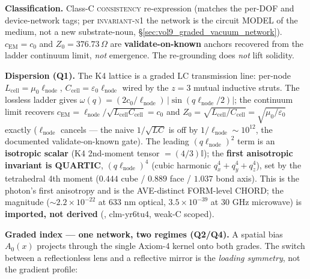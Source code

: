 \noindent\textbf{Classification.} Class-C \textsc{consistency} re-expression (matches the per-DOF and device-network tags; per \textsc{invariant-n1} the network is the circuit MODEL of the medium, not a new substrate-noun, \S\ref{sec:vol9_graded_vacuum_network}). $c_{\mathrm{EM}}=c_0$ and $Z_0=376.73\,\Omega$ are \textbf{validate-on-known} anchors recovered from the ladder continuum limit, \emph{not} emergence. The re-grounding does \emph{not} lift solidity.

\medskip\noindent\textbf{Dispersion (Q1).} The K4 lattice is a graded LC transmission line: per-node $L_{\mathrm{cell}}=\mu_0\ell_{\mathrm{node}}$, $C_{\mathrm{cell}}=\varepsilon_0\ell_{\mathrm{node}}$ wired by the $z=3$ mutual inductive struts. The lossless ladder gives $\omega(q)=(2c_0/\ell_{\mathrm{node}})\,|\sin(q\ell_{\mathrm{node}}/2)|$; the continuum limit recovers $c_{\mathrm{EM}}=\ell_{\mathrm{node}}/\sqrt{L_{\mathrm{cell}}C_{\mathrm{cell}}}=c_0$ and $Z_0=\sqrt{L_{\mathrm{cell}}/C_{\mathrm{cell}}}=\sqrt{\mu_0/\varepsilon_0}$ exactly ($\ell_{\mathrm{node}}$ cancels --- the naive $1/\sqrt{LC}$ is off by $1/\ell_{\mathrm{node}}\sim10^{12}$, the documented validate-on-known gate). The leading $(q\ell_{\mathrm{node}})^2$ term is an \textbf{isotropic scalar} (K4 2nd-moment tensor $=(4/3)\mathbb{I}$); the \textbf{first anisotropic invariant is QUARTIC}, $(q\ell_{\mathrm{node}})^4$ (cubic harmonic $q_x^4+q_y^4+q_z^4$), set by the tetrahedral 4th moment ($0.444$ cube / $0.889$ face / $1.037$ bond axis). This is the photon's first anisotropy and is the AVE-distinct FORM-level CHORD; the magnitude ($\sim2.2\times10^{-22}$ at $633$ nm optical, $3.5\times10^{-39}$ at $30$ GHz microwave) is \textbf{imported, not derived} (, clm-yr6tu4, weak-C scoped).

\medskip\noindent\textbf{Graded index --- one network, two regimes (Q2/Q4).} A spatial bias $A_0(x)$ projects through the single Axiom-4 kernel onto both grades. The switch between a reflectionless lens and a reflective mirror is the \emph{loading symmetry}, not the gradient profile:

